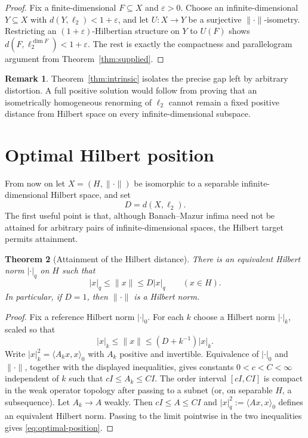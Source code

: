 \documentclass[11pt]{article}
\newtheorem{theorem}{Theorem}[section]
\theoremstyle{definition}
\newtheorem{remark}[theorem]{Remark}
\begin{document}
\begin{proof}
Fix a finite-dimensional $F\subseteq X$ and $\varepsilon>0$.  Choose an
infinite-dimensional $Y\subseteq X$ with $d(Y,\ell_2)<1+\varepsilon$, and let
$U:X\to Y$ be a surjective $\|\cdot\|$-isometry.  Restricting an
$(1+\varepsilon)$-Hilbertian structure on $Y$ to $U(F)$ shows
$d(F,\ell_2^{\dim F})<1+\varepsilon$.  The rest is exactly the compactness and
parallelogram argument from Theorem~\ref{thm:supplied}.
\end{proof}

\begin{remark}
Theorem~\ref{thm:intrinsic} isolates the precise gap left by arbitrary
distortion.  A full positive solution would follow from proving that an
isometrically homogeneous renorming of $\ell_2$ cannot remain a fixed positive
distance from Hilbert space on every infinite-dimensional subspace.
\end{remark}

\section{Optimal Hilbert position}\label{sec:optimal}

From now on let $X=(H,\|\cdot\|)$ be isomorphic to a separable
infinite-dimensional Hilbert space, and set
\[
 D=d(X,\ell_2).
\]
The first useful point is that, although Banach--Mazur infima need not be
attained for arbitrary pairs of infinite-dimensional spaces, the Hilbert
target permits attainment.

\begin{theorem}[Attainment of the Hilbert distance]\label{thm:attainment}
There is an equivalent Hilbert norm $|\cdot|_q$ on $H$ such that
\begin{equation}\label{eq:optimal-position}
 |x|_q\leq\|x\|\leq D|x|_q\qquad(x\in H).
\end{equation}
In particular, if $D=1$, then $\|\cdot\|$ is a Hilbert norm.
\end{theorem}

\begin{proof}
Fix a reference Hilbert norm $|\cdot|_0$.  For each $k$ choose a Hilbert norm
$|\cdot|_k$, scaled so that
\[
 |x|_k\leq\|x\|\leq(D+k^{-1})|x|_k.
\]
Write $|x|_k^2=\langle A_kx,x\rangle_0$ with $A_k$ positive and invertible.
Equivalence of $|\cdot|_0$ and $\|\cdot\|$, together with the displayed
inequalities, gives constants $0<c<C<\infty$ independent of $k$ such that
$cI\leq A_k\leq CI$.  The order interval $[cI,CI]$ is compact in the weak
operator topology after passing to a subnet (or, on separable $H$, a
subsequence).  Let $A_k\to A$ weakly.  Then $cI\leq A\leq CI$ and
$|x|_q^2:=\langle Ax,x\rangle_0$ defines an equivalent Hilbert norm.  Passing
to the limit pointwise in the two inequalities gives
\eqref{eq:optimal-position}.
\end{proof}
\end{document}
